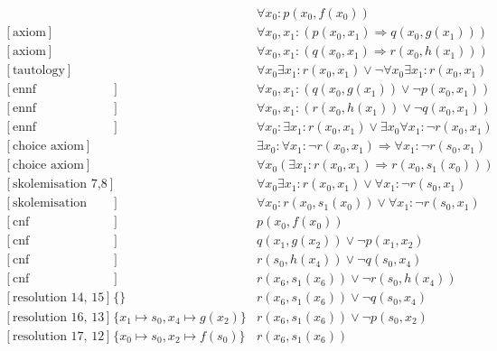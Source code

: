 \documentclass[onehalfspacing]{article}
\begin{document}
\setcounter{equation}{0}
\begin{align}
	[\text{axiom}] && \forall x_0: p(x_0,f(x_0))\\
	[\text{axiom}] && \forall x_0, x_1 : (p(x_0,x_1) \Rightarrow q(x_0,g(x_1)))\\
	[\text{axiom}] && \forall x_0, x_1 : (q(x_0,x_1) \Rightarrow r(x_0,h(x_1)))\\
	[\text{tautology}] &&\forall  x_0 \exists x_1 : r(x_0,x_1)\vee \neg\forall  x_0 \exists x_1 : r(x_0,x_1)\\
	[\text{ennf transformation 2}] && \forall x_0, x_1 : (q(x_0,g(x_1)) \vee \neg p(x_0,x_1)) \\
	[\text{ennf transformation 3}] &&\forall x_0, x_1 : (r(x_0,h(x_1)) \vee \neg q(x_0, x_1)) \\
	[\text{ennf transformation 4}] && \forall  x_0 : \exists x_1 : r(x_0,x_1)\vee \exists x_0 \forall x_1 : \neg r(x_0, x_1)\\
	[\text{choice axiom}] && \exists x_0 : \forall x_1 : \neg r(x_0, x_1) \Rightarrow \forall x_1 : \neg r(s_0,x_1)\\
	[\text{choice axiom}] &&\forall x_0(\exists x_1: r(x_0, x_1)\Rightarrow r(x_0, s_1(x_0)))\\
	[\text{skolemisation 7,8}] && \forall  x_0 \exists x_1 : r(x_0,x_1)\vee \forall x_1 : \neg r(s_0, x_1)\\
	[\text{skolemisation 9,10}] && \forall  x_0 :  r(x_0, s_1(x_0))\vee \forall x_1 : \neg r(s_0, x_1)\\
	[\text{cnf transformation 1}] && p(x_0,f(x_0))\\
	[\text{cnf transformation 5}] && q(x_1,g(x_2)) \vee \neg p(x_1, x_2)\\
	[\text{cnf transformation 6}] && r(s_0,h(x_4)) \vee \neg q(s_0, x_4)\\
	[\text{cnf transformation 11}] && r(x_6, s_1(x_6))\vee\neg r(s_0,h(x_4))\\
	[\text{resolution 14, 15}] &\{\}&r(x_6, s_1(x_6))\vee\neg q(s_0,x_4)\\
	[\text{resolution 16, 13}] &\{x_1\mapsto s_0, x_4\mapsto g(x_2)\}&r(x_6, s_1(x_6))\vee\neg p(s_0,x_2)\\
	[\text{resolution 17, 12}] &\{x_0\mapsto s_0, x_2\mapsto f(s_0)\}&r(x_6, s_1(x_6))
\end{align}
\end{document}
